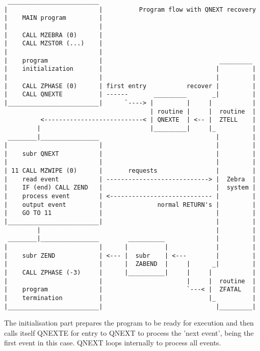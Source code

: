 \begin{verbatim}
 _________________________
|                         |          Program flow with QNEXT recovery
|    MAIN program         |
|                         |
|    CALL MZEBRA (0)      |
|    CALL MZSTOR (...)    |
|                         |
|    program              |                                _________
|    initialization       |                               |         |
|                         |                               |         |
|    CALL ZPHASE (0)      | first entry           recover |         |
|    CALL QNEXTE          | ------       _________       _|         |
|_________________________|      `----> |         |     |           |
                                        | routine |     |  routine  |
          <---------------------------< | QNEXTE  | <-- |  ZTELL    |
         |                              |_________|     |_          |
 ________|________________                                |         |
|                         |                               |         |
|    subr QNEXT           |                               |         |
|                         |                               |         |
| 11 CALL MZWIPE (0)      |       requests                |         |
|    read event           | ----------------------------> |  Zebra  |
|    IF (end) CALL ZEND   |                               |  system |
|    process event        | <---------------------------- |         |
|    output event         |               normal RETURN's |         |
|    GO TO 11             |                               |         |
|_________________________|                               |         |
         |                                                |         |
 ________|________________        __________              |         |
|                         |      |          |             |         |
|    subr ZEND            | <--- |  subr    | <---        |         |
|                         |      |  ZABEND  |     |      _|         |
|    CALL ZPHASE (-3)     |      |__________|     |     |           |
|                         |                       |     |  routine  |
|    program              |                       `---< |  ZFATAL   |
|    termination          |                             |_          |
|_________________________|                               |_________|

\end{verbatim} 
The initialisation part prepares the program to be ready
for execution and then calls itself QNEXTE for entry to QNEXT
to process the 'next event',
being the first event in this case.
QNEXT loops internally to process all events.

